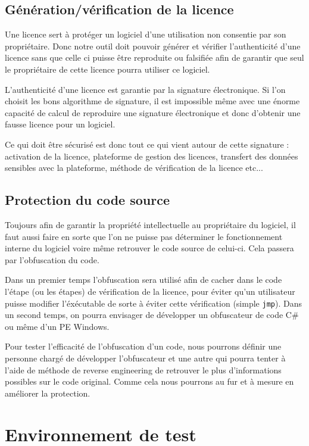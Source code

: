 \section{Génération/vérification de la licence}
Une licence sert à protéger un logiciel d'une utilisation non consentie par son propriétaire.
Donc notre outil doit pouvoir générer et vérifier l'authenticité d'une licence sans que celle
ci puisse être reproduite ou falsifiée afin de garantir que seul le propriétaire de cette licence
pourra utiliser ce logiciel.

L'authenticité d'une licence est garantie par la signature électronique. Si l'on choisit les bons
algorithme de signature, il est impossible même avec une énorme capacité de calcul de reproduire
une signature électronique et donc d'obtenir une fausse licence pour un logiciel.

Ce qui doit être sécurisé est donc tout ce qui vient autour de cette signature : activation de la
licence, plateforme de gestion des licences, transfert des données sensibles avec la plateforme,
méthode de vérification de la licence etc...

\section{Protection du code source}
Toujours afin de garantir la propriété intellectuelle au propriétaire du logiciel, il faut aussi
faire en sorte que l'on ne puisse pas déterminer le fonctionnement interne du logiciel voire même
retrouver le code source de celui-ci. Cela passera par l'obfuscation du code.

Dans un premier temps l'obfuscation sera utilisé afin de cacher dans le code l'étape (ou les
étapes) de vérification de la licence, pour éviter qu'un utilisateur puisse modifier l'éxécutable
de sorte à éviter cette vérification (simple \verb:jmp:). Dans un second temps, on pourra envisager
de développer un obfuscateur de code C\# ou même d'un PE Windows.

Pour tester l'efficacité de l'obfuscation d'un code, nous pourrons définir une personne chargé
de développer l'obfuscateur et une autre qui pourra tenter à l'aide de méthode de reverse
engineering de retrouver le plus d'informations possibles sur le code original. Comme cela
nous pourrons au fur et à mesure en améliorer la protection.

\chapter{Environnement de test}


